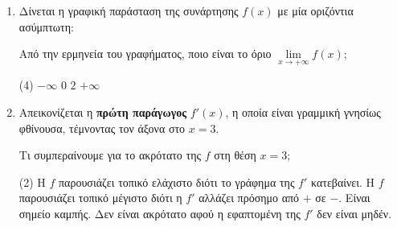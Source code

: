 \documentclass[11pt,a4paper]{article}
\renewcommand{\textdexiakeraia}{}
\begin{document}
\begin{enumerate}[label=\textbf{\arabic*.}, itemsep=4mm]
    \item Δίνεται η γραφική παράσταση της συνάρτησης $f(x)$ με μία οριζόντια ασύμπτωτη:
    \begin{center}
    \end{center}
    Από την ερμηνεία του γραφήματος, ποιο είναι το όριο $\lim\limits_{x\to +\infty} f(x)$;
    \begin{tasks}[label=\let\textdexiakeraia\relax\alph*.](4)
        \task $-\infty$
        \task $0$
        \task $2$
        \task $+\infty$
    \end{tasks}

    \item Απεικονίζεται η \textbf{πρώτη παράγωγος} $f'(x)$, η οποία είναι γραμμική γνησίως φθίνουσα, τέμνοντας τον άξονα στο $x=3$.
    \begin{center}
    \end{center}
    Τι συμπεραίνουμε για το ακρότατο της $f$ στη θέση $x=3$;
    \begin{tasks}[label=\let\textdexiakeraia\relax\alph*.](2)
        \task H $f$ παρουσιάζει τοπικό ελάχιστο διότι το γράφημα της $f'$ κατεβαίνει.
        \task H $f$ παρουσιάζει τοπικό μέγιστο διότι η $f'$ αλλάζει πρόσημο από $+$ σε $-$.
        \task Είναι σημείο καμπής.
        \task Δεν είναι ακρότατο αφού η εφαπτομένη της $f'$ δεν είναι μηδέν.
    \end{tasks}


\end{enumerate}
\end{document}
